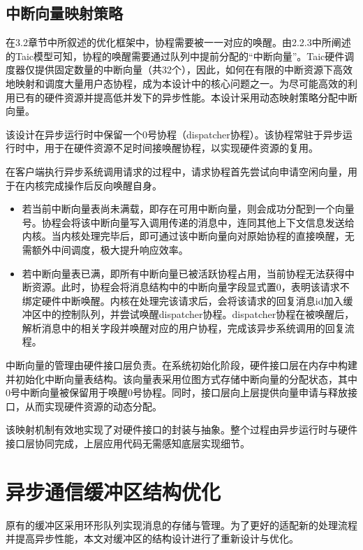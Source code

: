 \subsection{中断向量映射策略}\label{sec:intrdesign}

在3.2章节中所叙述的优化框架中，协程需要被一一对应的唤醒。由2.2.3中所阐述的Taic模型可知，协程的唤醒需要通过队列中提前分配的“中断向量”。Taic硬件调度器仅提供固定数量的中断向量（共32个），因此，如何在有限的中断资源下高效地映射和调度大量用户态协程，成为本设计中的核心问题之一。为尽可能高效的利用已有的硬件资源并提高低并发下的异步性能。本设计采用动态映射策略分配中断向量。

该设计在异步运行时中保留一个0号协程（dispatcher协程）。该协程常驻于异步运行时中，用于在硬件资源不足时间接唤醒协程，以实现硬件资源的复用。

在客户端执行异步系统调用请求的过程中，请求协程首先尝试向申请空闲向量，用于在内核完成操作后反向唤醒自身。

\begin{itemize}
  \item 若当前中断向量表尚未满载，即存在可用中断向量，则会成功分配到一个向量号。协程会将该中断向量写入调用传递的消息中，连同其他上下文信息发送给内核。当内核处理完毕后，即可通过该中断向量向对原始协程的直接唤醒，无需额外中间调度，极大提升响应效率。

  \item 若中断向量表已满，即所有中断向量已被活跃协程占用，当前协程无法获得中断资源。此时，协程会将消息结构中的中断向量字段显式置0，表明该请求不绑定硬件中断唤醒。内核在处理完该请求后，会将该请求的回复消息id加入缓冲区中的控制队列，并尝试唤醒dispatcher协程。dispatcher协程在被唤醒后，解析消息中的相关字段并唤醒对应的用户协程，完成该异步系统调用的回复流程。
\end{itemize}

中断向量的管理由硬件接口层负责。在系统初始化阶段，硬件接口层在内存中构建并初始化中断向量表结构。该向量表采用位图方式存储中断向量的分配状态，其中0号中断向量被保留用于唤醒0号协程。同时，接口层向上层提供向量申请与释放接口，从而实现硬件资源的动态分配。

该映射机制有效地实现了对硬件接口的封装与抽象。整个过程由异步运行时与硬件接口层协同完成，上层应用代码无需感知底层实现细节。

\section{异步通信缓冲区结构优化}\label{sec:buffer}

原有的缓冲区采用环形队列实现消息的存储与管理。为了更好的适配新的处理流程并提高异步性能，本文对缓冲区的结构设计进行了重新设计与优化。

